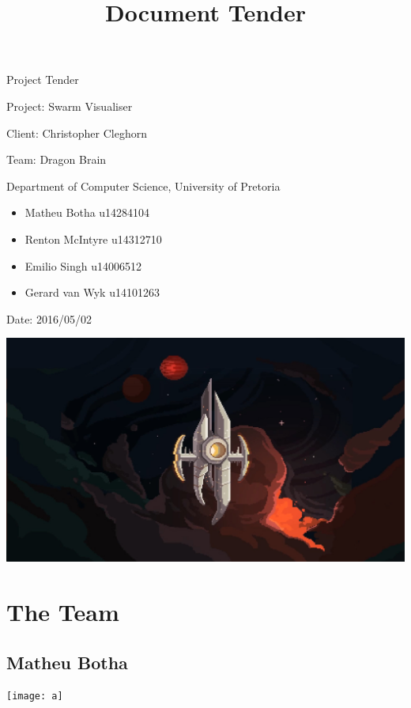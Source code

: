 \documentclass[12pt]{article}
\begin{document}
\title{Document Tender}

\begin{titlepage}
\begin{huge}
\begin{center}
Project Tender

Project: Swarm Visualiser
\\
\begin{LARGE}
Client: Christopher Cleghorn
\end{LARGE}

Team: Dragon Brain
\\
\begin{small}
Department of Computer Science, University of Pretoria
\\
\begin{itemize}
\item Matheu Botha u14284104
\item Renton McIntyre u14312710
\item Emilio Singh u14006512
\item Gerard van Wyk u14101263
\end{itemize}


Date: 2016/05/02

\end{small}

\includegraphics[scale=0.2]{test}
\end{center}

\end{huge}


\end{titlepage}

\pagebreak

\section{The Team}
\subsection{Matheu Botha}
\texttt{[image: a]}
\end{document}
